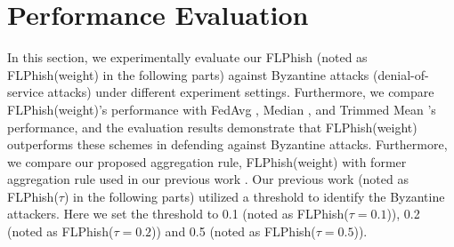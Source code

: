 \documentclass[journal]{IEEEtran}
\begin{document}
\section{Performance Evaluation}
In this section, we experimentally evaluate our FLPhish (noted as FLPhish(weight) in the following parts) against Byzantine attacks (denial-of-service attacks) under different experiment settings. Furthermore, we compare FLPhish(weight)'s performance with FedAvg \cite{ref_01_GoogleFL}, Median \cite{ref_13_defense}, and Trimmed Mean \cite{ref_13_defense}'s performance, and the evaluation results demonstrate that FLPhish(weight) outperforms these schemes in defending against Byzantine attacks. Furthermore, we compare our proposed aggregation rule, FLPhish(weight) with former aggregation rule used in our previous work \cite{li2021flphish}. Our previous work (noted as FLPhish($\tau$) in the following parts) utilized a threshold to identify the Byzantine attackers. Here we set the threshold to 0.1 (noted as FLPhish($\tau=0.1$)), 0.2 (noted as FLPhish($\tau=0.2$)) and 0.5 (noted as FLPhish($\tau=0.5$)).
\end{document}

